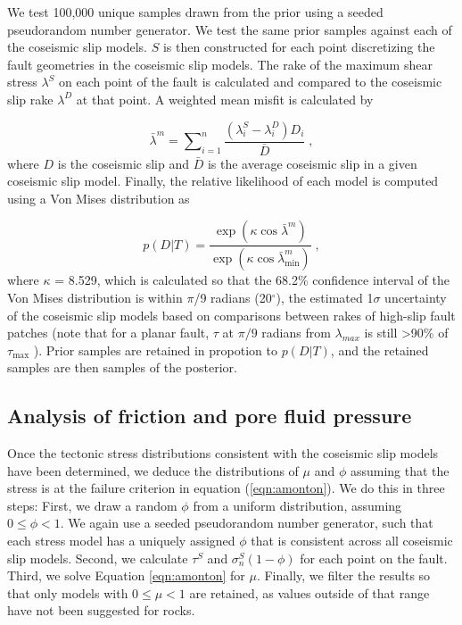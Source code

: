 \documentclass[draft,jgrga]{AGUTeX}
\begin{document}
\begin{article}
We test 100,000 unique samples drawn from the prior using a seeded
pseudorandom number generator. We test the same prior samples against
each of the coseismic slip models. $S$ is then constructed for each
point discretizing the fault geometries in the coseismic slip models.
The rake of the maximum shear stress $\lambda^S$ on each point of the
fault is calculated and compared to the coseismic slip rake $\lambda^D$
at that point. A weighted mean misfit is calculated by

\begin{equation}
\bar{\lambda}^m = \sum \nolimits_{i=1}^n \frac{(\lambda^S_i - \lambda^D_i) D_i} 
{\bar{ D}} \; ,
\label{eqn:rake_misfit}
\end{equation}
where $D$ is the coseismic slip and $\bar{D}$ is the average coseismic
slip in a given coseismic slip model. Finally, the relative likelihood
of each model is computed using a Von Mises distribution as

\begin{equation}
p (D | T) = \frac{ \exp ( \kappa \cos \bar{\lambda}^m )} 
{\exp (\kappa \cos \bar{\lambda}^m_{\min})} \;,
\label{eqn:rel_likelihood}
\end{equation}
where $\kappa$ = 8.529, which is calculated so that the 68.2\%
confidence interval of the Von Mises distribution is within $\pi$/9 radians
(20$^{\circ}$), the estimated 1$\sigma$ uncertainty of the coseismic
slip models based on comparisons between rakes of high-slip fault
patches (note that for a planar fault, $\tau$ at $\pi/9$ radians from
$\lambda_{max}$ is still \textgreater{}90\% of $\tau_{\mathrm{\max}}$
\citep{lisle2013}). Prior samples are retained in propotion to $p(D|T)$,
and the retained samples are then samples of the posterior.

\subsection{Analysis of friction and pore fluid
pressure}\label{analysis-of-friction-and-pore-fluid-pressure}

Once the tectonic stress distributions consistent with the coseismic
slip models have been determined, we deduce the distributions of $\mu$
and $\phi$ assuming that the stress is at the failure criterion in
equation (\ref{eqn:amonton}). We do this in three steps: First, we draw
a random $\phi$ from a uniform distribution, assuming $0 \leq \phi < 1$.
We again use a seeded pseudorandom number generator, such that each
stress model has a uniquely assigned $\phi$ that is consistent 
across all coseismic slip models. Second, we calculate $\tau^S$ and
$\sigma_n^S(1-\phi)$ for each point on the fault. Third, we solve
Equation \ref{eqn:amonton} for $\mu$. Finally, we filter the results so
that only models with $0 \le \mu < 1$ are retained, as values outside of
that range have not been suggested for rocks.


\end{article}
\end{document}
